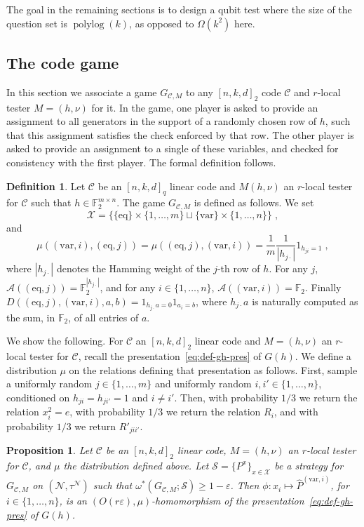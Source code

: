 \documentclass[11pt]{article}
\newtheorem{proposition}[theorem]{Proposition}
\theoremstyle{definition}
\newtheorem{definition}[theorem]{Definition}
\newcommand{\code}{\mathscr{C}}
\newcommand{\strategy}{\mathscr{S}}
\newcommand{\F}{\ensuremath{\mathbb{F}}}
\newcommand{\mA}{\ensuremath{\mathcal{A}}}
\newcommand{\mX}{\ensuremath{\mathcal{X}}}
\newcommand{\eps}{\varepsilon}
\newcommand{\mN}{\mathcal{N}}
\DeclareMathOperator{\polylog}{polylog}
\newcommand{\eq}{\mathrm{eq}}
\newcommand{\var}{\mathrm{var}}
\begin{document}
The goal in the remaining sections is to design a qubit test where the size of the question set is $\polylog(k)$, as opposed to $\Omega(k^2)$ here. 

\subsection{The code game}
\label{sec:code-game}

In this section we associate a game $G_{\code,M}$ to any $[n,k,d]_2$ code $\code$ and $r$-local tester $M=(h,\nu)$ for it. In the game, one player is asked to provide an assignment to all generators in the support of a randomly chosen row of $h$, such that this assignment satisfies the check enforced by that row. The other player is asked to provide an assignment to a single of these variables, and checked for consistency with the first player. The formal definition follows.  

\begin{definition}
Let $\code$ be an $[n,k,d]_q$ linear code and $M(h,\nu)$ an $r$-local tester for $\code$ such that $h\in \F_2^{m\times n}$. The game $G_{\code,M}$ is defined as follows. We set 
\[\mX = \big\{ \{\eq\}\times\{1,\ldots,m\} \sqcup\{\var\}\times \{1,\ldots,n\}\big\}\;,\]
and
\[\mu((\var,i),(\eq,j))=\mu((\eq,j),(\var,i)) = \frac{1}{m} \frac{1}{|h_{j\cdot}|} 1_{h_{ji}=1}\;,\]
where $|h_{j\cdot}|$ denotes the Hamming weight of the $j$-th row of $h$. For any $j$, $\mA((\eq,j))=\F_2^{|h_{j\cdot}|}$, and for any $i\in\{1,\ldots,n\}$, $\mA((\var,i))=\F_2$. Finally $D((\eq,j),(\var,i),a,b)=1_{h_{j\cdot} a=0} 1_{a_i=b}$, where $h_{j\cdot}a$ is naturally computed as the sum, in $\F_2$, of all entries of $a$.  
\end{definition}

We show the following. For $\code$ an $[n,k,d]_2$ linear code and $M=(h,\nu)$ an $r$-local tester for $\code$, recall the presentation~\eqref{eq:def-gh-pres} of $G(h)$. We define a distribution $\mu$ on the relations defining that presentation as follows. First, sample a uniformly random $j\in\{1,\ldots,m\}$ and uniformly random $i,i'\in\{1,\ldots,n\}$, conditioned on $h_{ji}=h_{ji'}=1$ and $i\neq i'$. Then, with probability $1/3$ we return the relation $x_i^2=e$, with probability $1/3$ we return the relation $R_i$, and with probability $1/3$ we return $R'_{jii'}$. 

\begin{proposition}\label{prop:rep-game}
Let $\code$ be an $[n,k,d]_2$ linear code, $M=(h,\nu)$ an $r$-local tester for $\code$, and $\mu$ the distribution defined above. Let $\strategy = \{P^{x}\}_{x \in \mX}$ be a strategy for $G_{\code,M}$ on $(\mN,\tau^\mN)$ such that $\omega^*(G_{\code,M};\strategy)\geq 1-\eps$. Then $\phi:x_i\mapsto {\widehat{P}}^{(\var,i)}$, for $i\in\{1,\ldots,n\}$, is an $(O(r\eps),\mu)$-homomorphism of the presentation~\eqref{eq:def-gh-pres} of $G(h)$.
\end{proposition}
\end{document}
